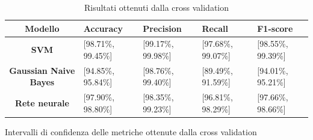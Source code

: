 \begin{table}[!ht]
\begin{subtable}[h]{1\textwidth}
\begin{tabular}{@{}cllll@{}}
            \rowcolor[HTML]{EFEFEF}
            \textbf{Modello}                                      & \textbf{Accuracy}  & \textbf{Precision} & \textbf{Recall}    & \textbf{F1-score}  \\ \midrule
            \cellcolor[HTML]{EFEFEF}\textbf{SVM}                  & [98.71\%, 99.45\%] & [99.17\%, 99.98\%] & [97.68\%, 99.07\%] & [98.55\%, 99.39\%] \\
            \cellcolor[HTML]{EFEFEF}\textbf{Gaussian Naive Bayes} & [94.85\%, 95.84\%] & [98.76\%, 99.40\%] & [89.49\%, 91.59\%] & [94.01\%, 95.21\%] \\
            \cellcolor[HTML]{EFEFEF}\textbf{Rete neurale}         & [97.90\%, 98.80\%] & [98.35\%, 99.23\%] & [96.81\%, 98.29\%] & [97.66\%, 98.66\%] \\ \bottomrule
        \end{tabular}
        \caption{Intervalli di confidenza delle metriche ottenute dalla cross validation}
        \label{tab:intervalli_confidenza_corr}
    \end{subtable}
    \caption{Risultati ottenuti dalla cross validation}
    \label{tab:metriche_intervalli_confidenza_corr}
\end{table}

